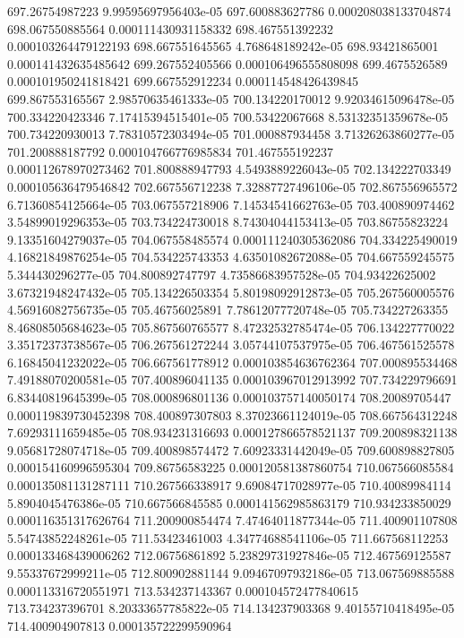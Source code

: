{697.26754987223 9.99595697956403e-05
697.600883627786 0.000208038133704874
698.067550885564 0.000111430931158332
698.467551392232 0.000103264479122193
698.667551645565 4.768648189242e-05
698.93421865001 0.000141432635485642
699.267552405566 0.000106496555808098
699.4675526589 0.000101950241818421
699.667552912234 0.000114548426439845
699.867553165567 2.98570635461333e-05
700.134220170012 9.92034615096478e-05
700.334220423346 7.17415394515401e-05
700.53422067668 8.53132351359678e-05
700.734220930013 7.78310572303494e-05
701.000887934458 3.71326263860277e-05
701.200888187792 0.000104766776985834
701.467555192237 0.000112678970273462
701.800888947793 4.5493889226043e-05
702.134222703349 0.000105636479546842
702.667556712238 7.32887727496106e-05
702.867556965572 6.71360854125664e-05
703.067557218906 7.14534541662763e-05
703.400890974462 3.54899019296353e-05
703.734224730018 8.74304044153413e-05
703.86755823224 9.13351604279037e-05
704.067558485574 0.000111240305362086
704.334225490019 4.16821849876254e-05
704.534225743353 4.63501082672088e-05
704.667559245575 5.344430296277e-05
704.800892747797 4.73586683957528e-05
704.93422625002 3.67321948247432e-05
705.134226503354 5.80198092912873e-05
705.267560005576 4.56916082756735e-05
705.46756025891 7.78612077720748e-05
705.734227263355 8.46808505684623e-05
705.867560765577 8.47232532785474e-05
706.134227770022 3.35172373738567e-05
706.267561272244 3.05744107537975e-05
706.467561525578 6.16845041232022e-05
706.667561778912 0.000103854636762364
707.000895534468 7.49188070200581e-05
707.400896041135 0.000103967012913992
707.734229796691 6.83440819645399e-05
708.000896801136 0.000103757140050174
708.20089705447 0.000119839730452398
708.400897307803 8.37023661124019e-05
708.667564312248 7.69293111659485e-05
708.934231316693 0.000127866578521137
709.200898321138 9.05681728074718e-05
709.400898574472 7.60923331442049e-05
709.600898827805 0.000154160996595304
709.86756583225 0.000120581387860754
710.067566085584 0.000135081131287111
710.267566338917 9.69084717028977e-05
710.40089984114 5.8904045476386e-05
710.667566845585 0.000141562985863179
710.934233850029 0.000116351317626764
711.200900854474 7.47464011877344e-05
711.400901107808 5.54743852248261e-05
711.53423461003 4.34774688541106e-05
711.667568112253 0.000133468439006262
712.06756861892 5.23829731927846e-05
712.467569125587 9.55337672999211e-05
712.800902881144 9.09467097932186e-05
713.067569885588 0.000113316720551971
713.534237143367 0.000104572477840615
713.734237396701 8.20333657785822e-05
714.134237903368 9.40155710418495e-05
714.400904907813 0.000135722299590964
}
